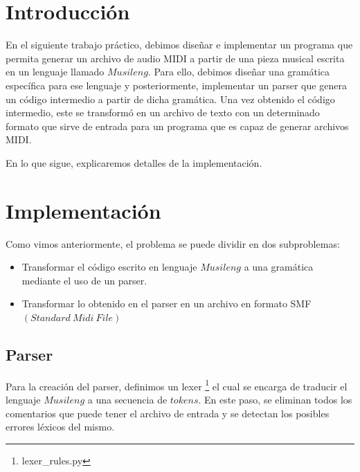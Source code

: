 \documentclass[a4paper, 10pt, twoside]{article}
\begin{document}
\newpage

\tableofcontents

\newpage



\section{Introducción}

En el siguiente trabajo práctico, debimos diseñar e implementar un programa que permita generar un archivo de audio MIDI a partir de una pieza musical escrita en un lenguaje llamado $Musileng$. Para ello, debimos diseñar una gramática específica para ese lenguaje y posteriormente, implementar un parser que genera un código intermedio a partir de dicha gramática. Una vez obtenido el código intermedio, este se transformó en un archivo de texto con un determinado formato que sirve de entrada para un programa que es capaz de generar archivos MIDI.

En lo que sigue, explicaremos detalles de la implementación.
\newpage


\section{Implementación}
Como vimos anteriormente, el problema se puede dividir en dos subproblemas:
\begin{itemize}
 \item Transformar el código escrito en lenguaje $Musileng$ a una gramática mediante el uso de un parser.

 \item Transformar lo obtenido en el parser en un archivo en formato SMF $(Standard\ Midi\ File)$ 

\end{itemize}

\subsection{Parser}
Para la creación del parser, definimos un lexer \footnote{lexer\_rules.py} el cual se encarga de traducir el lenguaje $Musileng$ a una secuencia de $tokens$. En este paso, se eliminan todos los comentarios que puede tener el archivo de entrada y se detectan los posibles errores léxicos del mismo.
\end{document}
